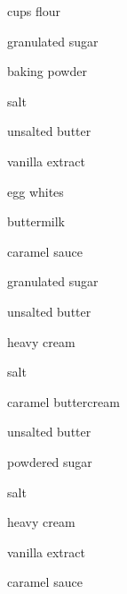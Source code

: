 \begin{ingredient}
    \begin{main}
        \item {} cups flour
        \item {} granulated sugar
        \item {} baking powder
        \item {} salt
        \item {} unsalted butter
        \item {} vanilla extract
        \item {} egg whites
        \item {} buttermilk
    \end{main}
    \begin{subingredient}{caramel sauce}
        \item {} granulated sugar
        \item {} unsalted butter
        \item {} heavy cream
        \item {} salt
    \end{subingredient}
    \begin{subingredient}{caramel buttercream}
        \item {} unsalted butter
        \item {} powdered sugar
        \item {} salt
        \item {} heavy cream
        \item {} vanilla extract
        \item {} caramel sauce
    \end{subingredient}
\end{ingredient}
